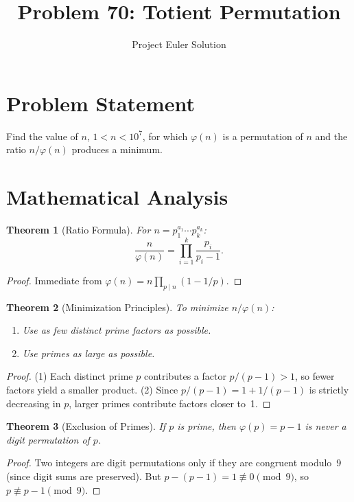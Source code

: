 \documentclass[12pt,a4paper]{article}
\title{Problem 70: Totient Permutation}
\author{Project Euler Solution}
\date{}
\newtheorem{theorem}{Theorem}
\begin{document}
\maketitle

\section{Problem Statement}

Find the value of $n$, $1 < n < 10^7$, for which $\varphi(n)$ is a permutation of $n$ and the ratio $n/\varphi(n)$ produces a minimum.

\section{Mathematical Analysis}

\begin{theorem}[Ratio Formula]
For $n = p_1^{a_1} \cdots p_k^{a_k}$:
\[
\frac{n}{\varphi(n)} = \prod_{i=1}^{k} \frac{p_i}{p_i - 1}.
\]
\end{theorem}

\begin{proof}
Immediate from $\varphi(n) = n \prod_{p \mid n}(1 - 1/p)$.
\end{proof}

\begin{theorem}[Minimization Principles]
To minimize $n/\varphi(n)$:
\begin{enumerate}
    \item Use as few distinct prime factors as possible.
    \item Use primes as large as possible.
\end{enumerate}
\end{theorem}

\begin{proof}
(1) Each distinct prime $p$ contributes a factor $p/(p-1) > 1$, so fewer factors yield a smaller product. (2) Since $p/(p-1) = 1 + 1/(p-1)$ is strictly decreasing in $p$, larger primes contribute factors closer to~1.
\end{proof}

\begin{theorem}[Exclusion of Primes]
If $p$ is prime, then $\varphi(p) = p - 1$ is never a digit permutation of $p$.
\end{theorem}

\begin{proof}
Two integers are digit permutations only if they are congruent modulo~9 (since digit sums are preserved). But $p - (p-1) = 1 \not\equiv 0 \pmod{9}$, so $p \not\equiv p-1 \pmod{9}$.
\end{proof}
\end{document}
